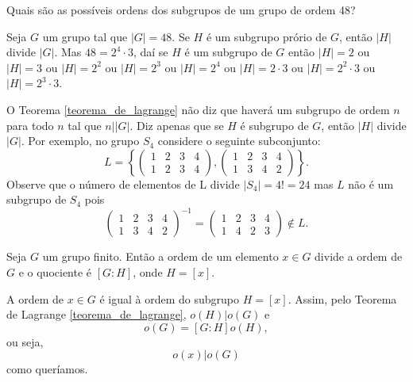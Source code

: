 \begin{exemplo}
    Quais são as possíveis ordens dos subgrupos de um grupo de ordem 48?
    \begin{solucao}
        Seja $G$ um grupo tal que $|G|=48$. Se $H$ é um subgrupo prório de $G$, então $|H|$ divide $|G|$. Mas $48=2^{4}\cdot 3$, daí se $H$ é um subgrupo de $G$ então $|H|=2$ ou $|H|=3$ ou $|H|= 2^{2}$ ou $|H|=2^{3}$ ou $|H|=2^{4}$ ou $|H|=2\cdot3$ ou $|H|=2^2\cdot 3$ ou $|H|=2^3\cdot 3$.
    \end{solucao}
\end{exemplo}

\begin{observacao}
    O Teorema \ref{teorema_de_lagrange} não diz que haverá um subgrupo de ordem $n$ para todo $n$ tal que $n||G|$. Diz apenas que se $H$ é subgrupo de $G$, então $|H|$ divide $|G|$. Por exemplo, no grupo $S_4$ considere o seguinte subconjunto:
            \[
                L = \left\{\begin{pmatrix}
                    1 & 2 & 3 & 4\\
                    1 & 2 & 3 & 4
                \end{pmatrix}, \begin{pmatrix}
                    1 & 2 & 3 & 4\\
                    1 & 3 & 4 & 2
                \end{pmatrix}\right\}.
            \]
            Observe que o n\'umero de elementos de L divide $|S_4| = 4! = 24$ mas $L$ não é um subgrupo de $S_4$ pois
            \[
                \begin{pmatrix}
                    1 & 2 & 3 & 4\\
                    1 & 3 & 4 & 2
                \end{pmatrix}^{-1} = \begin{pmatrix}
                    1 & 2 & 3 & 4\\
                    1 & 4 & 2 & 3
                \end{pmatrix} \notin L.
            \]
\end{observacao}

\begin{corolario}\label{primeiro_coralario_Lagrange}
    Seja $G$ um grupo finito. Então a ordem de um elemento $x \in G$ divide a ordem de $G$ e o quociente é $[G : H]$, onde $H = [x]$.
\end{corolario}
\begin{prova}
    A ordem de $x \in G$ é igual à ordem do subgrupo $H = [x]$. Assim, pelo Teorema de Lagrange \eqref{teorema_de_lagrange}, $o(H) | o(G)$ e
    \[
        o(G) = [G : H]o(H),
    \]
    ou seja,
    \[
        o(x) | o(G)
    \]
    como queríamos.
\end{prova}

